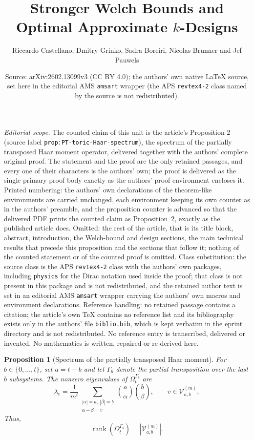 \documentclass[10pt,a4paper]{amsart}
\title{Stronger Welch Bounds and Optimal Approximate $k$-Designs}
\author{Riccardo Castellano, Dmitry Grinko, Sadra Boreiri, Nicolas Brunner and Jef Pauwels}
\date{Source: arXiv:2602.13099v3 (CC BY 4.0); the authors' own native \LaTeX{} source, set here in the editorial AMS \texttt{amsart} wrapper (the APS \texttt{revtex4-2} class named by the source is not redistributed).}
\theoremstyle{plain}
\newtheorem{prop}{Proposition}
\begin{document}
\maketitle
\noindent\textit{Editorial scope.} The counted claim of this unit is the article's Proposition 2 (source label \texttt{prop:PT-toric-Haar-spectrum}), the spectrum of the partially transposed Haar moment operator, delivered together with the authors' complete original proof. The statement and the proof are the only retained passages, and every one of their characters is the authors' own; the proof is delivered as the single primary proof body exactly as the authors' proof environment encloses it. Printed numbering: the authors' own declarations of the theorem-like environments are carried unchanged, each environment keeping its own counter as in the authors' preamble, and the proposition counter is advanced so that the delivered PDF prints the counted claim as Proposition~2, exactly as the published article does. Omitted: the rest of the article, that is its title block, abstract, introduction, the Welch-bound and design sections, the main technical results that precede this proposition and the sections that follow it; nothing of the counted statement or of the counted proof is omitted. Class substitution: the source class is the APS \texttt{revtex4-2} class with the authors' own packages, including \texttt{physics} for the Dirac notation used inside the proof; that class is not present in this package and is not redistributed, and the retained author text is set in an editorial AMS \texttt{amsart} wrapper carrying the authors' own macros and environment declarations. Reference handling: no retained passage contains a citation; the article's own TeX contains no reference list and its bibliography exists only in the authors' file \texttt{biblio.bib}, which is kept verbatim in the eprint directory and is not redistributed. No reference entry is transcribed, delivered or invented. No mathematics is written, repaired or re-derived here.

\setcounter{prop}{1}
\begin{prop}[Spectrum of the partially transposed Haar moment]
    \label{prop:PT-toric-Haar-spectrum}
     For $b\in\{0,\dotsc,t\}$, set $a=t-b$ and let $\mathsf{\Gamma}_{b}$ denote the partial transposition over the last $b$ subsystems. The nonzero eigenvalues of $\Omega_t^{\mathsf{\Gamma}_b}$ are
    \begin{equation}
        \lambda_v
        =
        \frac{1}{m^t}
        \sum_{\substack{|\alpha|=a,\ |\beta|=b\\
                        \alpha-\beta=v}}
        \binom{a}{\alpha}
        \binom{b}{\beta},
        \qquad
        v\in\mathcal{V}_{a,b}^{(m)},
        \label{eq:PT-toric-eigenvalues}
    \end{equation}
    Thus,
    \begin{equation}
        \operatorname{rank}\!\left(\Omega_t^{\mathsf{\Gamma}_b}\right)
        =
        \left|\mathcal{V}_{a,b}^{(m)}\right|.
        \label{eq:PT-toric-rank}
    \end{equation}
\end{prop}
\end{document}
